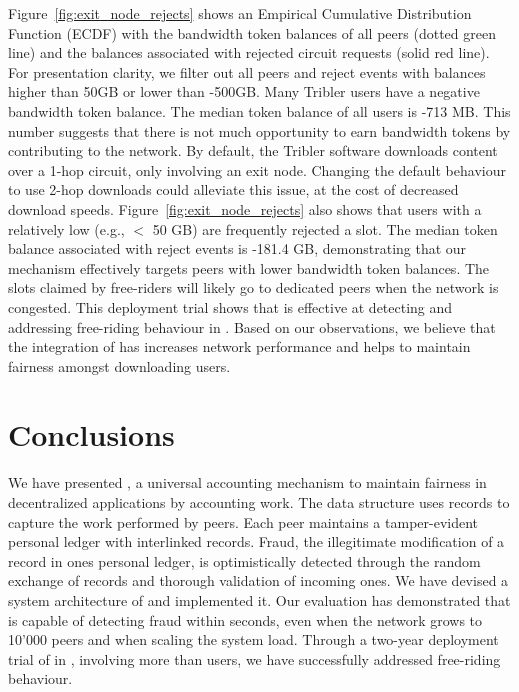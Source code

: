 Figure~\ref{fig:exit_node_rejects} shows an Empirical Cumulative Distribution Function (ECDF) with the bandwidth token balances of all peers (dotted green line) and the balances associated with rejected circuit requests (solid red line).
For presentation clarity, we filter out all peers and reject events with balances higher than 50GB or lower than -500GB.
Many Tribler users have a negative bandwidth token balance.
The median token balance of all users is -713 MB.
This number suggests that there is not much opportunity to earn bandwidth tokens by contributing to the network.
By default, the Tribler software downloads content over a 1-hop circuit, only involving an exit node.
Changing the default behaviour to use 2-hop downloads could alleviate this issue, at the cost of decreased download speeds.
Figure~\ref{fig:exit_node_rejects} also shows that users with a relatively low (e.g., $ < $ 50 GB) are frequently rejected a slot.
The median token balance associated with reject events is -181.4 GB, demonstrating that our mechanism effectively targets peers with lower bandwidth token balances.
The slots claimed by free-riders will likely go to dedicated peers when the network is congested.
This deployment trial shows that \TrustChain{} is effective at detecting and addressing free-riding behaviour in \Tribler{}.
Based on our observations, we believe that the integration of \TrustChain{} has increases network performance and helps to maintain fairness amongst downloading users.



\section{Conclusions}
We have presented \TrustChain{}, a universal accounting mechanism to maintain fairness in decentralized applications by accounting work.
The \TrustChain{} data structure uses records to capture the work performed by peers.
Each peer maintains a tamper-evident personal ledger with interlinked records.
Fraud, the illegitimate modification of a record in ones personal ledger, is optimistically detected through the random exchange of records and thorough validation of incoming ones.
We have devised a system architecture of \TrustChain{} and implemented it.
Our evaluation has demonstrated that \TrustChain{} is capable of detecting fraud within seconds, even when the network grows to 10'000 peers and when scaling the system load.
Through a two-year deployment trial of \TrustChain{} in \Tribler{}, involving more than \TrialUsers{} users, we have successfully addressed free-riding behaviour.

